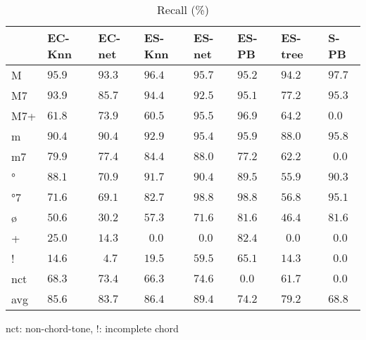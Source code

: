 \documentclass{article}
\begin{document}
\begin{table}
  \centering
  \begin{tabular}{l|p{.5cm}p{.5cm}p{.5cm}p{.5cm}p{.5cm}p{.5cm}p{.5cm}}

   &EC-Knn&EC-net &ES-Knn &ES-net &ES-PB  &ES-tree&S-PB   \\
\hline                                            
M  &$95.9$&$ 93.3$&$ 96.4$&$ 95.7$&$ 95.2$&$ 94.2$&$ 97.7$ \\
M7 &$93.9$&$ 85.7$&$ 94.4$&$ 92.5$&$ 95.1$&$ 77.2$&$ 95.3$ \\
M7+&$61.8$&$ 73.9$&$ 60.5$&$ 95.5$&$ 96.9$&$ 64.2$&$  0.0$ \\
m  &$90.4$&$ 90.4$&$ 92.9$&$ 95.4$&$ 95.9$&$ 88.0$&$ 95.8$ \\
m7 &$79.9$&$ 77.4$&$ 84.4$&$ 88.0$&$ 77.2$&$ 62.2$&$~~0.0$ \\
°  &$88.1$&$ 70.9$&$ 91.7$&$ 90.4$&$ 89.5$&$ 55.9$&$ 90.3$ \\
°7 &$71.6$&$ 69.1$&$ 82.7$&$ 98.8$&$ 98.8$&$ 56.8$&$ 95.1$ \\
ø  &$50.6$&$ 30.2$&$ 57.3$&$ 71.6$&$ 81.6$&$ 46.4$&$ 81.6$ \\
+  &$25.0$&$ 14.3$&$~~0.0$&$~~0.0$&$ 82.4$&$~~0.0$&$~~0.0$ \\
!  &$14.6$&$~~4.7$&$ 19.5$&$ 59.5$&$ 65.1$&$ 14.3$&$~~0.0$ \\
nct&$68.3$&$ 73.4$&$ 66.3$&$ 74.6$&$~ 0.0$&$ 61.7$&$~~0.0$ \\
avg&$85.6$&$ 83.7$&$ 86.4$&$ 89.4$&$ 74.2$&$ 79.2$&$ 68.8$ \\
  \end{tabular}                                                        

\medskip

nct: non-chord-tone, !: incomplete chord
  \caption{Recall (\%)}
  \label{tab:recall}
\end{table}
\end{document}
